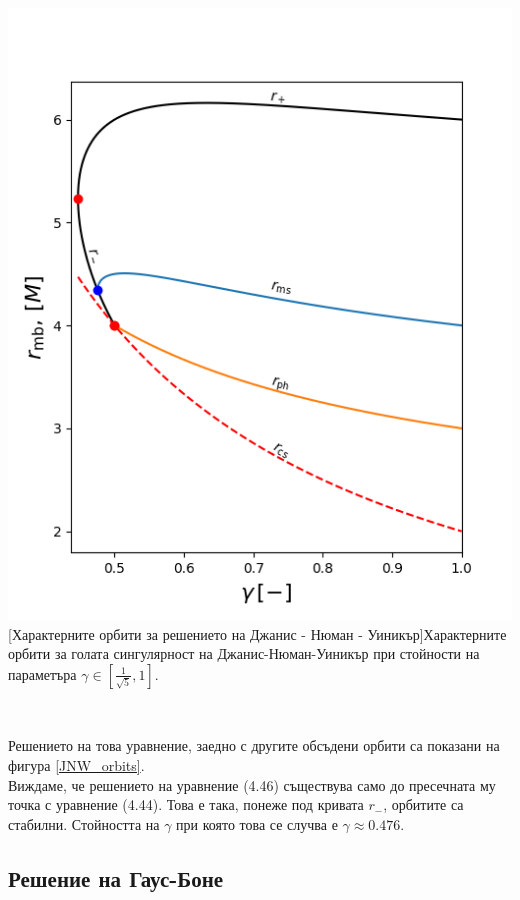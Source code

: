 \begin{minipage}{14em}
	\hspace{-0.3cm}
	\includegraphics[scale = 0.45]{JNW_orbits.png}
	[Характерните орбити за решението на Джанис - Нюман - Уиникър]{\small Характерните орбити за голата сингулярност на Джанис-Нюман-Уиникър при стойности на параметъра $\gamma \in [\frac{1}{\sqrt{5}}, 1]$.}
	\label{JNW_orbits}
\end{minipage}\,\,\,
\begin{minipage}{20em}
Решението на това уравнение, заедно с другите обсъдени орбити са показани на фигура \ref{JNW_orbits}.\\

Виждаме, че решението на уравнение (4.46) съществува само до пресечната му точка с уравнение (4.44). Това е така, понеже под кривата $r_-$, орбитите са стабилни. Стойността на $\gamma$ при която това се случва е $\gamma\approx 0.476$.

\end{minipage}
\newpage
\subsection{Решение на Гаус-Боне}

